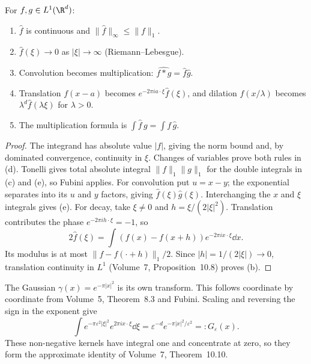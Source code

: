 \begin{proposition}\label{prop:ftl1}
For $f,g\in L^1(\R^d)$:
\begin{enumerate}
\item[(a)] $\hat f$ is continuous and $\|\hat f\|_\infty\le\|f\|_1$.
\item[(b)] $\hat f(\xi)\to0$ as $|\xi|\to\infty$ (Riemann--Lebesgue).
\item[(c)] Convolution becomes multiplication: $\widehat{f*g}=\hat f\hat g$.
\item[(d)] Translation $f(x-a)$ becomes $e^{-2\pi ia\cdot\xi}\hat f(\xi)$, and dilation $f(x/\lambda)$ becomes $\lambda^d\hat f(\lambda\xi)$ for $\lambda>0$.
\item[(e)] The multiplication formula is $\int\hat f\,g=\int f\,\hat g$.
\end{enumerate}
\end{proposition}
\begin{proof}
The integrand has absolute value $|f|$, giving the norm bound and, by dominated convergence, continuity in $\xi$. Changes of variables prove both rules in (d). Tonelli gives total absolute integral $\|f\|_1\|g\|_1$ for the double integrals in (c) and (e), so Fubini applies. For convolution put $u=x-y$; the exponential separates into its $u$ and $y$ factors, giving $\hat f(\xi)\hat g(\xi)$. Interchanging the $x$ and $\xi$ integrals gives (e).
For decay, take $\xi\ne0$ and $h=\xi/(2|\xi|^2)$. Translation contributes the phase $e^{-2\pi ih\cdot\xi}=-1$, so
\[
2\hat f(\xi)=\int(f(x)-f(x+h))e^{-2\pi ix\cdot\xi}\dd x.
\]
Its modulus is at most $\|f-f(\cdot+h)\|_1/2$. Since $|h|=1/(2|\xi|)\to0$, translation continuity in $L^1$ (Volume~7, Proposition~10.8) proves (b).
\end{proof}

The Gaussian $\gamma(x)=e^{-\pi|x|^2}$ is its own transform. This follows coordinate by coordinate from Volume~5, Theorem~8.3 and Fubini. Scaling and reversing the sign in the exponent give
\begin{equation}\label{eq:gaussft}
\int e^{-\pi\varepsilon^2|\xi|^2}e^{2\pi ix\cdot\xi}\dd\xi
=\varepsilon^{-d}e^{-\pi|x|^2/\varepsilon^2}=:G_\varepsilon(x).
\end{equation}
These non-negative kernels have integral one and concentrate at zero, so they form the approximate identity of Volume~7, Theorem~10.10.

